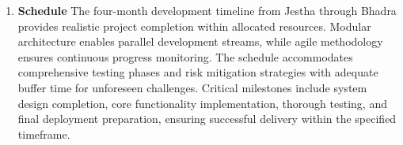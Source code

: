 \begin{enumerate}[label=\roman*.]
    \item \textbf{Schedule}
          The four-month development timeline from Jestha through Bhadra provides realistic project completion within allocated resources. Modular architecture enables parallel development streams, while agile methodology ensures continuous progress monitoring. The schedule accommodates comprehensive testing phases and risk mitigation strategies with adequate buffer time for unforeseen challenges. Critical milestones include system design completion, core functionality implementation, thorough testing, and final deployment preparation, ensuring successful delivery within the specified timeframe.


\end{enumerate}
